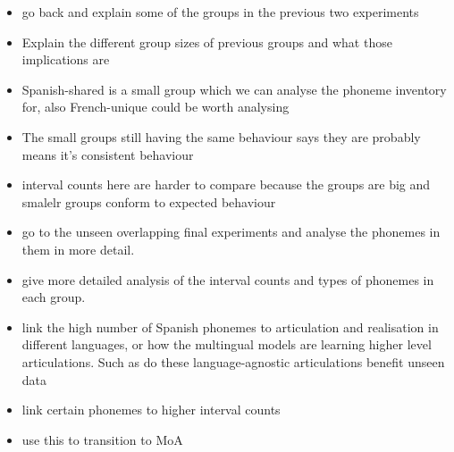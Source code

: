 \begin{itemize}
    \item go back and explain some of the groups in the previous two experiments
    \item Explain the different group sizes of previous groups and what those implications are
    \item Spanish-shared is a small group which we can analyse the phoneme inventory for, also French-unique could be worth analysing
    \item The small groups still having the same behaviour says they are probably means it's consistent behaviour
    \item interval counts here are harder to compare because the groups are big and smalelr groups conform to expected behaviour
    \item go to the unseen overlapping final experiments and analyse the phonemes in them in more detail.
    \item give more detailed analysis of the interval counts and types of phonemes in each group. 
    \item link the high number of Spanish phonemes to articulation and realisation in different languages, or how the multingual models are learning higher level articulations. Such as do these language-agnostic articulations benefit unseen data
    \item link certain phonemes to higher interval counts
    \item use this to transition to MoA
\end{itemize}

